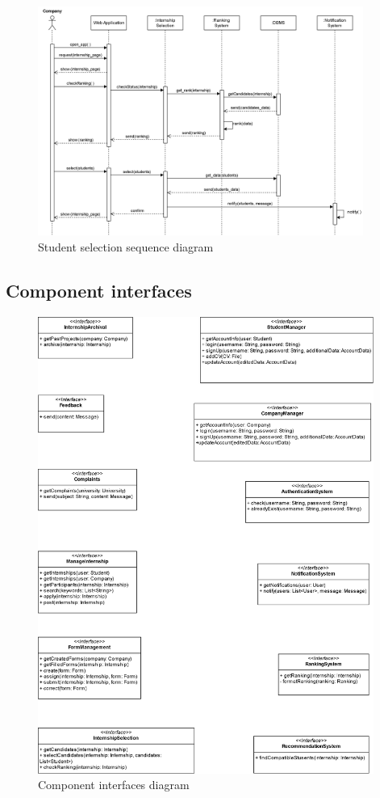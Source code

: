 \documentclass[11pt,twoside]{article}
\begin{document}
\begin{figure}[H]
\centering
\includegraphics[width=0.95\textwidth]{Images/Seq8}
\caption{Student selection sequence diagram}\label{Seq8}
\end{figure}

\newpage
	
	\subsection{Component interfaces}
\begin{figure}[H]
\centering
\includegraphics[width=0.98\textwidth]{Images/CompInterface}
\caption{Component interfaces diagram}\label{CompInterface}
\end{figure}
\end{document}
